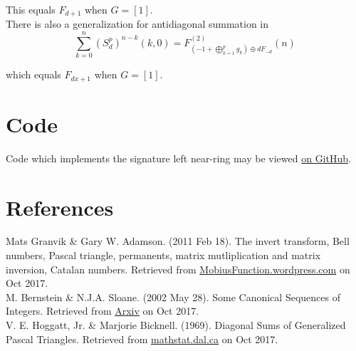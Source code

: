 \documentclass{article}
\begin{document}
\noindent This equals $F_{d+1}$ when $G = [1]$.\\

\noindent There is also a generalization for antidiagonal summation in \begin{equation} \sum_{k=0}^{n} (S_d^p)^{n-k}(k, 0) =  F^{(2)}_{\left(-1 + \displaystyle \bigoplus_{k=1}^{p} g_k \right) \oplus dF_{-d}}(n)\end{equation}

\noindent which equals $F_{dx + 1}$ when $G = [1]$.

\section{Code}

Code which implements the signature left near-ring may be viewed \href{https://github.com/cxr00/cxr/blob/master/cxr/math/snr.py}{on GitHub}.

\pagebreak
\section{References}

\noindent Mats Granvik \& Gary W. Adamson. (2011 Feb 18).  The invert transform, Bell numbers, Pascal triangle, permanents, matrix mutliplication and matrix inversion, Catalan numbers. Retrieved from \href{https://mobiusfunction.wordpress.com/2011/02/18/the-invert-transform-bell-numbers-pascal-triangle-permanents-matrix-multiplication-and-matrix-inversion-catalan-numbers/}{MobiusFunction.wordpress.com} on Oct 2017.\\

\noindent M. Bernstein \& N.J.A. Sloane. (2002 May 28). Some Canonical Sequences of Integers. Retrieved from \href{https://arxiv.org/pdf/math/0205301.pdf}{Arxiv} on Oct 2017.\\

\noindent V. E. Hoggatt, Jr. \& Marjorie Bicknell. (1969). Diagonal Sums of Generalized Pascal Triangles. Retrieved from \href{http://www.mathstat.dal.ca/FQ/Scanned/7-4/hoggatt-a.pdf}{mathstat.dal.ca} on Oct 2017.
\end{document}
